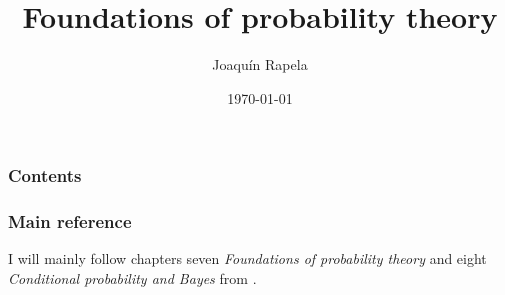 \newtheorem{manualprobRuleinner}{Rule}
\newenvironment{manualProbRule}[1]{%
  \renewcommand\themanualprobRuleinner{#1}%
  \manualprobRuleinner
}{\endmanualprobRuleinner}


\title{Foundations of probability theory}

\author{Joaqu\'{i}n Rapela} %
\date{\today} %




\begin{frame}
\titlepage %
\end{frame}

\begin{frame}
\frametitle{Contents} %
\tableofcontents %
\end{frame}

\begin{frame}
\frametitle{Main reference} %

    I will mainly follow chapters seven \textit{Foundations of probability
    theory} and eight \textit{Conditional probability and Bayes} from
    \citet{tijms12}.

\end{frame}

